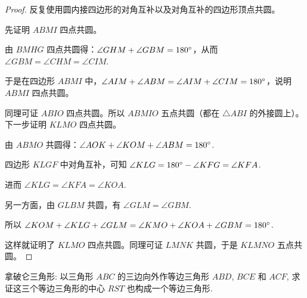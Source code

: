 \begin{proof}
反复使用圆内接四边形的对角互补以及对角互补的四边形顶点共圆。

先证明 $ ABMI $ 四点共圆。

由 $ BMHG $ 四点共圆得：$ \angle GHM + \angle GBM = 180 \degree $，从而 $ \angle GBM = \angle CHM = \angle CIM $.

于是在四边形 $ ABMI $ 中，$ \angle AIM + \angle ABM = \angle AIM + \angle CIM = 180\degree $，说明 $ ABMI $ 四点共圆。

同理可证 $ ABIO $ 四点共圆。所以 $ ABMIO $ 五点共圆（都在 $ \triangle ABI $ 的外接圆上）。下一步证明 $ KLMO $ 四点共圆。

由 $ ABMO $ 共圆得：$ \angle AOK + \angle KOM + \angle ABM = 180\degree $.

四边形 $ KLGF $ 中对角互补，可知 $ \angle KLG = 180\degree - \angle KFG = \angle KFA $.

进而 $ \angle KLG = \angle KFA = \angle KOA $.

另一方面，由 $ GLBM $ 共圆，有 $ \angle GLM = \angle GBM $.

所以 $ \angle KOM + \angle KLG + \angle GLM = \angle KMO + \angle KOA + \angle GBM = 180\degree $.

这样就证明了 $ KLMO $ 四点共圆。同理可证 $ LMNK $ 共圆，于是 $ KLMNO $ 五点共圆。

\end{proof}

\newpage
拿破仑三角形: 以三角形 $ ABC $ 的三边向外作等边三角形 $ ABD $, $ BCE $ 和 $ ACF $, 求证这三个等边三角形的中心 $ RST $ 也构成一个等边三角形.

